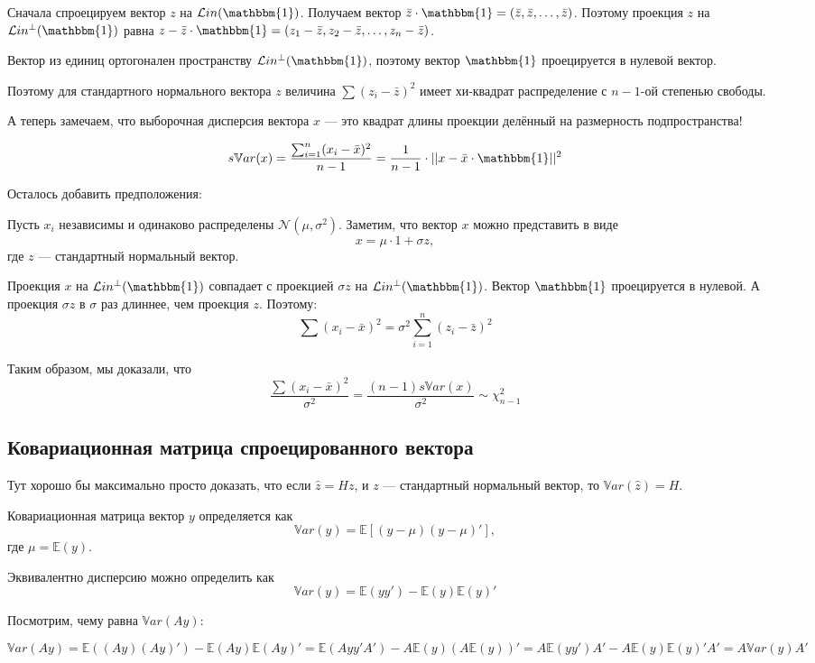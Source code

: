 \documentclass[11pt,russian,]{article}
\newcommand{\cN}{\mathcal{N}}
\newcommand{\E}{\mathbb{E}}
\newcommand{\1}{\mathbbm{1}}
\newcommand{\Lin}{\mathcal{L}in}
\newcommand{\Linp}{\Lin^{\perp}}
\newcommand{\sVar}{s\mathbb{V}ar}
\newcommand{\Var}{\mathbb{V}ar}
\begin{document}
Сначала спроецируем вектор \(z\) на \(\Lin(\1)\). Получаем вектор
\(\bar z \cdot \1 = (\bar z, \bar z, \ldots, \bar z)\). Поэтому проекция
\(z\) на \(\Linp(\1)\) равна
\(z - \bar z \cdot \1 = (z_1 - \bar z, z_2 - \bar z, \ldots, z_n - \bar z)\).

Вектор из единиц ортогонален пространству \(\Linp(\1)\), поэтому вектор
\(\1\) проецируется в нулевой вектор.

Поэтому для стандартного нормального вектора \(z\) величина
\(\sum (z_i - \bar z)^2\) имеет хи-квадрат распределение с \(n-1\)-ой
степенью свободы.

А теперь замечаем, что выборочная дисперсия вектора \(x\) --- это
квадрат длины проекции делённый на размерность подпространства!

\[
\sVar(x) = \frac{\sum_{i=1}^n (x_i - \bar x)^2}{n-1} = \frac{1}{n-1}\cdot ||x - \bar x \cdot \1||^2
\]

Осталось добавить предположения:

Пусть \(x_i\) независимы и одинаково распределены
\(\cN(\mu, \sigma^2)\). Заметим, что вектор \(x\) можно представить в
виде \[
x = \mu \cdot 1 + \sigma z,
\] где \(z\) --- стандартный нормальный вектор.

Проекция \(x\) на \(\Linp(\1)\) совпадает с проекцией \(\sigma z\) на
\(\Linp(\1)\). Вектор \(\1\) проецируется в нулевой. А проекция
\(\sigma z\) в \(\sigma\) раз длиннее, чем проекция \(z\). Поэтому: \[
\sum (x_i - \bar x)^2 = \sigma^2 \sum_{i=1}^n (z_i - \bar z)^2
\]

Таким образом, мы доказали, что \[
\frac{\sum (x_i - \bar x)^2}{\sigma^2} = \frac{(n-1)\sVar(x)}{\sigma^2} \sim \chi^2_{n-1}
\]

\subsection{Ковариационная матрица спроецированного вектора}\label{---}

Тут хорошо бы максимально просто доказать, что если \(\hat z = Hz\), и
\(z\) --- стандартный нормальный вектор, то \(\Var(\hat z) = H\).

Ковариационная матрица вектор \(y\) определяется как \[
\Var(y) = \E[(y-\mu)(y-\mu)'],
\] где \(\mu = \E(y)\).

Эквивалентно дисперсию можно определить как \[
\Var(y) = \E(yy')- \E(y)\E(y)'
\]

Посмотрим, чему равна \(\Var(Ay)\):

\[
\Var(Ay) = \E((Ay)(Ay)') - \E(Ay)\E(Ay)' = \E(Ayy'A') - A\E(y)(A\E(y))'=A\E(yy')A' - A\E(y)\E(y)'A'=A\Var(y)A'
\]
\end{document}
